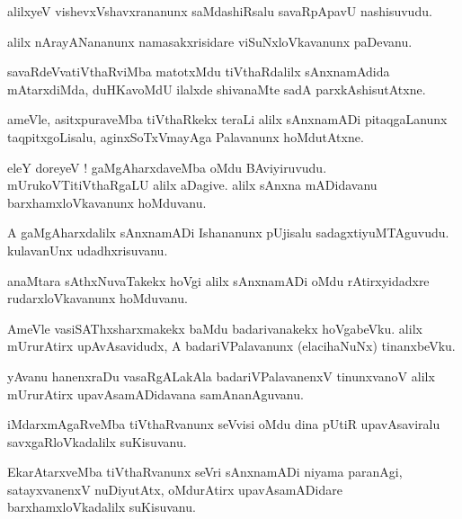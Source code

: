 \documentclass{article}
\begin{document}
\begin{mn}
alilxyeV vishevxVshavxrananunx saMdashiRsalu savaRpApavU nashisuvudu.
\end{mn}

\begin{mn}
alilx nArayANananunx namasakxrisidare viSuNxloVkavanunx paDevanu.
\end{mn}

\begin{mn}
savaRdeVvatiVthaRviMba matotxMdu tiVthaRdalilx sAnxnamAdida mAtarxdiMda, duHKavoMdU
ilalxde shivanaMte sadA parxkAshisutAtxne.
\end{mn}

\begin{mn}
ameVle, asitxpuraveMba tiVthaRkekx teraLi alilx sAnxnamADi pitaqgaLanunx taqpitxgoLisalu, 
aginxSoTxVmayAga Palavanunx hoMdutAtxne.
\end{mn}

\begin{mn}
eleY doreyeV ! gaMgAharxdaveMba oMdu BAviyiruvudu. mUrukoVTitiVthaRgaLU alilx aDagive. alilx sAnxna
mADidavanu barxhamxloVkavanunx hoMduvanu.
\end{mn}

\begin{mn}
A gaMgAharxdalilx sAnxnamADi Ishananunx pUjisalu sadagxtiyuMTAguvudu. kulavanUnx udadhxrisuvanu.
\end{mn}

\begin{mn}
anaMtara sAthxNuvaTakekx hoVgi alilx sAnxnamADi oMdu rAtirxyidadxre rudarxloVkavanunx hoMduvanu.
\end{mn}

\begin{mn}
AmeVle vasiSAThxsharxmakekx baMdu badarivanakekx hoVgabeVku. alilx mUrurAtirx upAvAsavidudx, A 
badariVPalavanunx (elacihaNuNx) tinanxbeVku.
\end{mn}

\begin{mn}
yAvanu hanenxraDu vasaRgALakAla badariVPalavanenxV tinunxvanoV alilx mUrurAtirx upavAsamADidavana
samAnanAguvanu.
\end{mn}

\begin{mn}
iMdarxmAgaRveMba tiVthaRvanunx seVvisi oMdu dina pUtiR upavAsaviralu savxgaRloVkadalilx suKisuvanu.
\end{mn}

\begin{mn}
EkarAtarxveMba tiVthaRvanunx seVri sAnxnamADi niyama paranAgi, satayxvanenxV nuDiyutAtx, 
oMdurAtirx upavAsamADidare barxhamxloVkadalilx suKisuvanu.
\end{mn}
\end{document}
